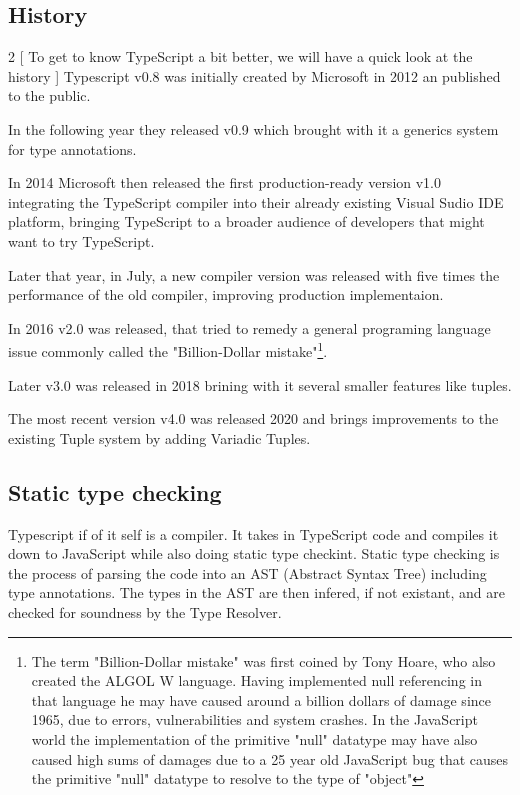 \documentclass[letterpaper,runningheads]{llncs}
\begin{document}
\subsection{History}

\begin{multicols}{2}
[
To get to know TypeScript a bit better, we will have a quick look at the history
]
\noindent
Typescript v0.8 was initially created by Microsoft in 2012 an published to the public. 

\medskip
\noindent
In the following year they released v0.9 which brought with it a generics system for type annotations. 

\medskip
\noindent
In 2014 Microsoft then released the first production-ready version v1.0 integrating the TypeScript compiler into their already existing Visual Sudio IDE platform, bringing TypeScript to a broader audience of developers that might want to try TypeScript. 

\medskip
\noindent
Later that year, in July, a new compiler version was released with five times the performance of the old compiler, improving production implementaion. 

\medskip
\noindent
In 2016 v2.0 was released, that tried to remedy a general programing language issue commonly called the "Billion-Dollar mistake"\footnote{The term "Billion-Dollar mistake" was first coined by Tony Hoare, who also created the ALGOL W language. Having implemented null referencing in that language he may have caused around a billion dollars of damage since 1965, due to errors, vulnerabilities and system crashes. In the JavaScript world the implementation of the primitive "null" datatype may have also caused high sums of damages due to a 25 year old JavaScript bug that causes the primitive "null" datatype to resolve to the type of "object"\cite{ref_billion_dollar_mistake}}. 

\medskip
\noindent
Later v3.0 was released in 2018 brining with it several smaller features like tuples. 

\medskip
\noindent
The most recent version v4.0 was released 2020 and brings improvements to the existing Tuple system by adding Variadic Tuples.
\end{multicols}

\subsection{Static type checking}

Typescript if of it self is a compiler. It takes in TypeScript code
and compiles it down to JavaScript while also doing static type checkint.
Static type checking is the process of parsing the code into an AST
(Abstract Syntax Tree) including type annotations. The types in the
AST are then infered, if not existant, and are checked for soundness
by the Type Resolver.
\end{document}
